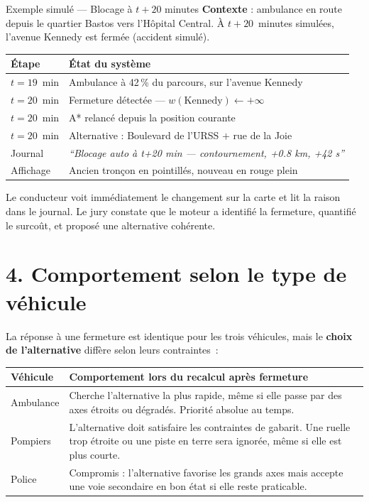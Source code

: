 \documentclass[12pt,a4paper]{article}
\begin{document}
\begin{exemplebox}{Exemple simul\'e --- Blocage \`a $t + 20$ minutes}
\textbf{Contexte} : ambulance en route depuis le quartier Bastos vers l'H\^opital
Central. \`A $t + 20$~minutes simul\'ees, l'avenue Kennedy est ferm\'ee
(accident simulé).

\medskip
\begin{tabular}{ll}
\toprule
\textbf{\'Etape} & \textbf{\'Etat du syst\`eme} \\
\midrule
$t = 19$~min  & Ambulance \`a 42\,\% du parcours, sur l'avenue Kennedy \\
$t = 20$~min  & Fermeture d\'etect\'ee --- $w(\text{Kennedy}) \leftarrow +\infty$ \\
$t = 20$~min  & A* relanc\'e depuis la position courante \\
$t = 20$~min  & Alternative : Boulevard de l'URSS $+$ rue de la Joie \\
Journal       & \textit{``Blocage auto \`a t+20 min --- contournement, +0.8 km, +42 s''} \\
Affichage     & Ancien tron\c{c}on en pointill\'es, nouveau en rouge plein \\
\bottomrule
\end{tabular}

\medskip
\noindent
Le conducteur voit imm\'ediatement le changement sur la carte et lit la raison
dans le journal.
Le jury constate que le moteur a identifi\'e la fermeture, quantifi\'e
le surco\^ut, et propos\'e une alternative coh\'erente.
\end{exemplebox}

\bigskip

\section*{4. Comportement selon le type de v\'ehicule}

La r\'eponse \`a une fermeture est identique pour les trois v\'ehicules,
mais le \textbf{choix de l'alternative} diff\`ere selon leurs contraintes~:

\medskip
\begin{tabular}{lp{9.5cm}}
\toprule
\textbf{V\'ehicule} & \textbf{Comportement lors du recalcul apr\`es fermeture} \\
\midrule
Ambulance
  & Cherche l'alternative la plus rapide, m\^eme si elle passe par
    des axes \'etroits ou d\'egrad\'es.
    Priorit\'e absolue au temps. \\[4pt]
Pompiers
  & L'alternative doit satisfaire les contraintes de gabarit.
    Une ruelle trop \'etroite ou une piste en terre sera ignor\'ee,
    m\^eme si elle est plus courte. \\[4pt]
Police
  & Compromis : l'alternative favorise les grands axes mais accepte
    une voie secondaire en bon \'etat si elle reste praticable. \\
\bottomrule
\end{tabular}
\end{document}
